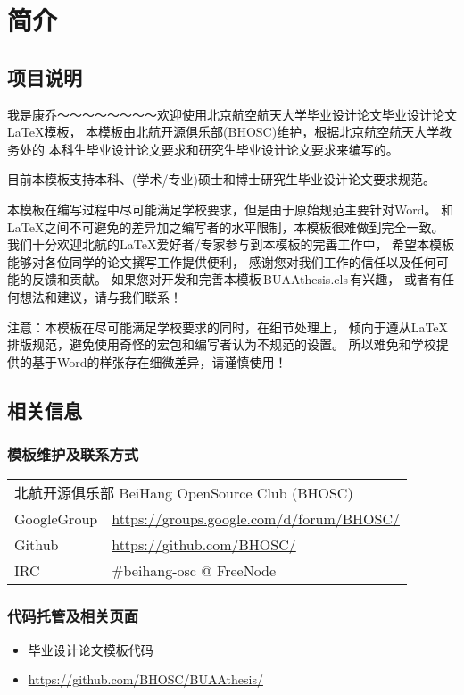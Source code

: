 \chapter{简介}

\section{项目说明}

我是康乔～～～～～～～～欢迎使用北京航空航天大学毕业设计论文毕业设计论文\LaTeX{}模板，
本模板由北航开源俱乐部(BHOSC)维护，根据北京航空航天大学教务处的
本科生毕业设计论文要求和研究生毕业设计论文要求来编写的。

目前本模板支持本科、(学术/专业)硕士和博士研究生毕业设计论文要求规范。

本模板在编写过程中尽可能满足学校要求，但是由于原始规范主要针对Word。
和\LaTeX{}之间不可避免的差异加之编写者的水平限制，本模板很难做到完全一致。
我们十分欢迎北航的\LaTeX{}爱好者/专家参与到本模板的完善工作中，
希望本模板能够对各位同学的论文撰写工作提供便利，
感谢您对我们工作的信任以及任何可能的反馈和贡献。
如果您对开发和完善本模板\,BUAAthesis.cls\,有兴趣，
或者有任何想法和建议，请与我们联系！

{\heiti 注意：}本模板在尽可能满足学校要求的同时，在细节处理上，
倾向于遵从\LaTeX{}排版规范，避免使用奇怪的宏包和编写者认为不规范的设置。
所以难免和学校提供的基于Word的样张存在细微差异，请谨慎使用！

\section{相关信息}

\subsection{模板维护及联系方式}
\begin{tabular}{ll}
    \multicolumn{2}{l}{北航开源俱乐部 BeiHang OpenSource Club (BHOSC)} \\
    GoogleGroup & \url{https://groups.google.com/d/forum/BHOSC/} \\
    Github      & \url{https://github.com/BHOSC/} \\
    IRC         & \#beihang-osc @ FreeNode
\end{tabular}

\subsection{代码托管及相关页面}
\begin{itemize}
    \item 毕业设计论文模板代码
    \item[] \url{https://github.com/BHOSC/BUAAthesis/}
\end{itemize}

